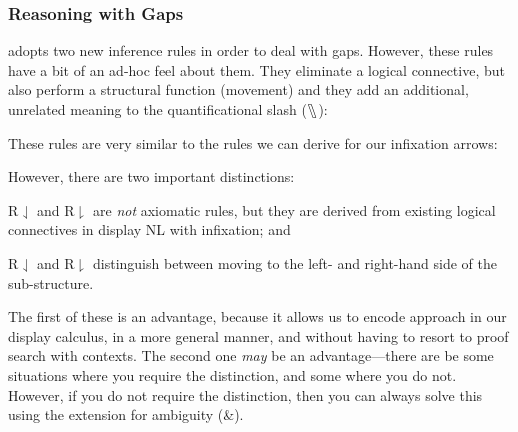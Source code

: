 \subsubsection{Reasoning with Gaps}
\citet[][chapter 17.10]{barker2015} adopts two new inference rules in
order to deal with gaps. However, these rules have a bit of an ad-hoc
feel about them. They eliminate a logical connective, but also
perform a structural function (movement) and they add an additional,
unrelated meaning to the quantificational slash ($\fatbslash$):
\begin{center}
  \begin{pfbox}
  \end{pfbox}
  \begin{pfbox}
  \end{pfbox}
\end{center}
These rules are very similar to the rules we can derive for our
infixation arrows:
\begin{center}
  \begin{pfbox}
  \end{pfbox}
  \begin{pfbox}
  \end{pfbox}
\end{center}
However, there are two important distinctions:
\begin{enumerate*}[label=(\arabic*)]
\item R${\downharpoonleft}$ and R${\downharpoonright}$ are \emph{not}
  axiomatic rules, but they are derived from existing logical
  connectives in display NL with infixation; and
\item R${\downharpoonleft}$ and R${\downharpoonright}$ distinguish
  between moving to the left- and right-hand side of the
  sub-structure.
\end{enumerate*}
The first of these is an advantage, because it allows us to encode
 approach in our display calculus, in a more
general manner, and without having to resort to proof search with
contexts. The second one \emph{may} be an advantage---there are be
some situations where you require the distinction, and some where you
do not. However, if you do not require the distinction, then you can
always solve this using the extension for ambiguity (\&).



